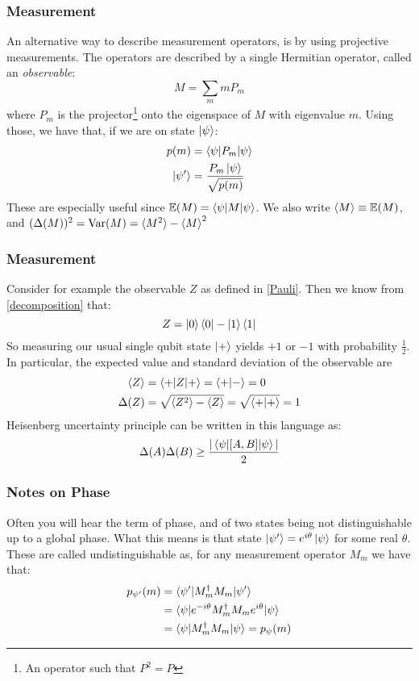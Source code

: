 \documentclass{beamer}
\begin{document}
\begin{frame}
    \frametitle{Measurement}
    An alternative way to describe measurement operators, is by using projective measurements.
    The operators are described by a single Hermitian operator, called an \textit{observable}:
    \begin{equation}
        M = \sum_m m P_m
    \end{equation}
    where $P_m$ is the projector\footnote{An operator such that $P^2 = P$ } onto the eigenspace of $M$ with eigenvalue $m$.
    Using those, we have that, if we are on state $\ket{\psi}$:
    \begin{align}
        p(m)        & = \braket{\psi|P_m|\psi}             \\
        \ket{\psi'} & = \frac{P_m \ket{\psi}}{\sqrt{p(m)}}
    \end{align}
    These are especially useful since $\mathbb{E}(M) = \braket{\psi|M|\psi}$.
    We also write $\braket{M} \equiv \mathbb{E}(M)$, and $(\Delta(M))^2 = \mathrm{Var}(M) = \braket{M^2} - \braket{M}^2$
\end{frame}
\begin{frame}
    \frametitle{Measurement}
    \begin{example}
        Consider for example the observable $Z$ as defined in \ref{Pauli}.
        Then we know from \ref{decomposition} that:
        \begin{equation}
            Z = \ket{0}\bra{0} - \ket{1}\bra{1}
        \end{equation}
        So measuring our usual single qubit state $\ket{+}$ yields $+1$ or $-1$ with
        probability $\frac{1}{2}$. In particular, the expected value and standard deviation of the observable
        are
        \begin{align}
            \braket{Z} & = \braket{+|Z|+} = \braket{+| -} = 0                         \\
            \Delta(Z)  & = \sqrt{\braket{Z^2} - \braket{Z}} = \sqrt{\braket{+|+}} = 1
        \end{align}
        Heisenberg uncertainty principle can be written in this language as:
        \begin{equation}
            \Delta(A)\Delta(B) \geq \frac{|\braket{\psi|[A, B]|\psi}|}{2}
        \end{equation}
    \end{example}
\end{frame}
\begin{frame}
    \frametitle{Notes on Phase}
    Often you will hear the term of phase, and of two states being not distinguishable
    up to a global phase. What this means is that state $\ket{\psi'} = e^{i\theta}\ket{\psi}$
    for some real $\theta$. These are called undistinguishable as, for any measurement
    operator $M_m$ we have that:
    \begin{align}
        p_{\psi'}(m) & = \braket{\psi'|M_m^\dagger M_m|\psi'}                        \\
                     & = \braket{\psi|e^{-i\theta}M_m^\dagger M_m e^{i\theta} |\psi} \\
                     & = \braket{\psi|M_m^\dagger M_m |\psi} = p_{\psi}(m)
    \end{align}
\end{frame}
\end{document}
